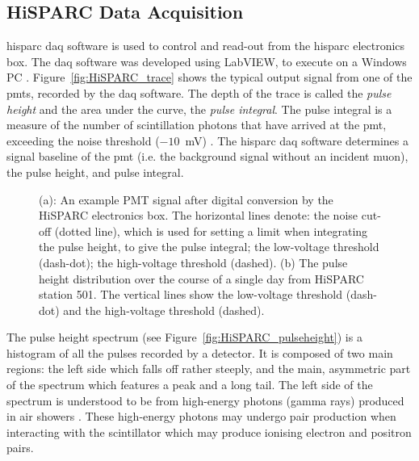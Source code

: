 \subsection{HiSPARC Data Acquisition}

\gls{hisparc} \gls{daq} software is used to control and read-out from the \gls{hisparc} electronics box. The \gls{daq} software was developed using LabVIEW, to execute on a Windows PC \citep{van_dam_hisparc_2020}. Figure~\ref{fig:HiSPARC_trace} shows the typical output signal from one of the \glspl{pmt}, recorded by the \gls{daq} software. The depth of the trace is called the \textit{pulse height} and the area under the curve, the \textit{pulse integral}. The pulse integral is a measure of the number of scintillation photons that have arrived at the \gls{pmt}, exceeding the noise threshold ($-10$~mV) \citep{van_dam_hisparc_2020}. The \gls{hisparc} \gls{daq} software determines a signal baseline of the \gls{pmt} (i.e. the background signal without an incident muon), the pulse height, and pulse integral.

\begin{figure}[ht!]
	\centering
	
	\caption{(a): An example PMT signal after digital conversion by the HiSPARC electronics box. The horizontal lines denote: the noise cut-off (dotted line), which is used for setting a limit when integrating the pulse height, to give the pulse integral; the low-voltage threshold (dash-dot); the high-voltage threshold (dashed). (b) The pulse height distribution over the course of a single day from HiSPARC station 501. The vertical lines show the low-voltage threshold (dash-dot) and the high-voltage threshold (dashed).}
	\label{fig:pulses}
\end{figure}

The pulse height spectrum (see Figure~\ref{fig:HiSPARC_pulseheight}) is a histogram of all the pulses recorded by a detector. It is composed of two main regions: the left side which falls off rather steeply, and the main, asymmetric part of the spectrum which features a peak and a long tail. The left side of the spectrum is understood to be from high-energy photons (gamma rays) produced in air showers \citep{fokkema_hisparc_2012}. These high-energy photons may undergo pair production when interacting with the scintillator which may produce ionising electron and positron pairs.

